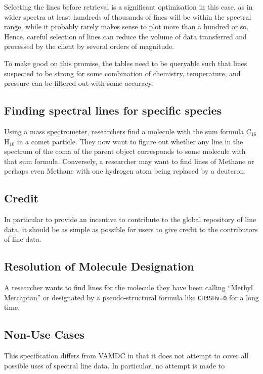 \documentclass[11pt,a4paper]{ivoa}
\begin{document}
Selecting the lines before retrieval is a significant optimisation in
this case, as in wider spectra at least hundreds of thousands of lines
will be within the spectral range, while it probably rarely makes sense
to plot more than a hundred or so.  Hence, careful selection of lines
can reduce the volume of data transferred and processed by the client by
several orders of magnitude.

To make good on this promise, the tables need to be queryable such that
lines suspected to be strong for some combination of chemistry,
temperature, and pressure can be filtered out with some accuracy.


\subsection{Finding spectral lines for specific species}

Using a mass spectrometer, researchers find a molecule with the
sum formula C$_{16}$H$_{10}$  in a comet particle.  They now want to
figure out whether any line in the spectrum of the coma of the parent
object corresponds to some molecule with that sum formula.
Conversely, a researcher may want to find lines of Methane or perhaps
even Methane with one hydrogen atom being replaced by a deuteron.


\subsection{Credit}

In particular to provide an incentive to contribute to the global
repository of line data, it should be as simple as possible for users to
give credit to the contributors of line data.

\subsection{Resolution of Molecule Designation}
\label{uc:resolution}

A researcher wants to find lines for the molecule they have been calling
``Methyl Mercaptan'' or designated by a pseudo-structural formula like
\verb|CH3SHv=0| for a long time.


\subsection{Non-Use Cases}

This specification differs from VAMDC in that it does not attempt to
cover all possible uses of spectral line data.  In particular, no
attempt is made to
\end{document}
